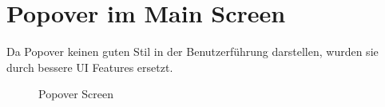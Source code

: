 \documentclass[
    DIV12,
    cleardouble=plain,
    headings=normal,
    pdftex,
    headexclude,footexclude,
    final
]{scrreprt}
\begin{document}
\section{Popover im Main Screen}
Da Popover keinen guten Stil in der Benutzerführung darstellen,  wurden sie durch bessere UI Features ersetzt.
\begin{figure}[H]
	\centering
	\caption{Popover Screen}
	\label{popover}
\end{figure}
\end{document}
